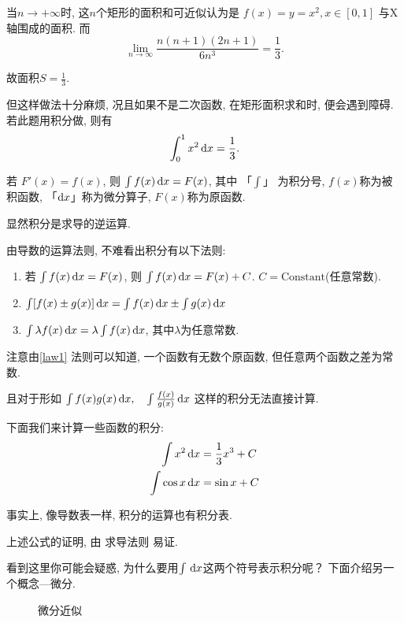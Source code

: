 当$n \to +\infty$时,
这$n$个矩形的面积和可近似认为是 $f(x) = y = x^{2},x\in [0, 1] $ 与X轴围成的面积.
而
\[
  \lim_{n \to \infty} \frac{n(n+1)(2n+1)}{6n^3 } = \frac{1}{3}
.\]

故面积$ S = \frac{1}{3}$.

但这样做法十分麻烦, 况且如果不是二次函数, 在矩形面积求和时, 便会遇到障碍.
若此题用积分做, 则有
\[
  \int_{0}^{1} x^{2} \mathop{}\!\mathrm{d} x= \frac{1}{3}
.\]
\begin{definition}[积分]
  若 $F'(x) = f(x)$, 则 $\int f(x) \mathop{}\!\mathrm{d} x = F(x)$, 其中 「$\int $」 为积分号,
  $f(x)$称为被积函数, 「$\mathop{}\!\mathrm{d} x$」称为微分算子, $F(x)$称为原函数.
\end{definition}
显然积分是求导的逆运算.

由导数的运算法则, 不难看出积分有以下法则:
\begin{enumerate}

  \item \label{law1} 若 $\int f(x) \mathop{}\!\mathrm{d} x = F(x)$, 则 $\int  f(x) \mathop{}\!\mathrm{d} x
    = F(x) + C$. $C = \mathrm{Constant} $(任意常数).
  \item $\int [f(x) \pm g(x)] \mathop{}\!\mathrm{d} x = \int f(x) \mathop{}\!\mathrm{d} x \pm \int g(x) \mathop{}\!\mathrm{d} x$
  \item $\int \lambda f(x) \mathop{}\!\mathrm{d} x = \lambda \int f(x) \mathop{}\!\mathrm{d} x$,
    其中$\lambda $为任意常数.

\end{enumerate}

注意由\cref{law1} 法则可以知道, 一个函数有无数个原函数,
但任意两个函数之差为常数.

且对于形如 $\int f(x)g(x) \mathop{}\!\mathrm{d} x,\quad \int \frac{f(x)}{g(x)} \mathop{}\!\mathrm{d} x$ 这样的积分无法直接计算.

下面我们来计算一些函数的积分:
\begin{align*}
  \int x^{2} \mathop{}\!\mathrm{d} x  & = \frac{1}{3} x ^3 +C \\
  \int \cos x \mathop{}\!\mathrm{d} x & = \sin x + C
\end{align*}

事实上, 像导数表一样, 积分的运算也有积分表.



上述公式的证明, 由 求导法则 易证.

看到这里你可能会疑惑, 为什么要用$\int \,\mathop{}\!\mathrm{d} x$这两个符号表示积分呢？
下面介绍另一个概念---微分.

\begin{figure}[ht]
  \centering
    
    \caption{微分近似}\label{fig:simdx}
\end{figure}

